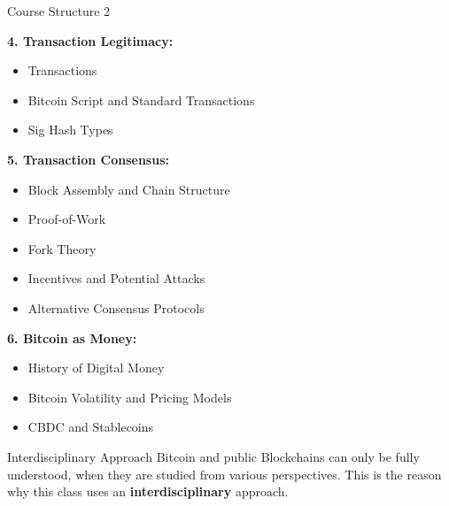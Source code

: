 \documentclass[handout]{beamer}
\begin{document}
\begin{frame}{Course Structure 2}
\footnotesize

\textbf{4. Transaction Legitimacy:}
	\begin{itemize}
		\item Transactions
		\item Bitcoin Script and Standard Transactions
		\item Sig Hash Types
	\end{itemize}	
	
\vspace{0.5em}

\textbf{5. Transaction Consensus:}
	\begin{itemize}
		\item Block Assembly and Chain Structure
		\item Proof-of-Work
		\item Fork Theory
		\item Incentives and Potential Attacks
		\item Alternative Consensus Protocols
	\end{itemize}

\vspace{0.5em}

\textbf{6. Bitcoin as Money:}
	\begin{itemize}
		\item History of Digital Money
		\item Bitcoin Volatility and Pricing Models
		\item CBDC and Stablecoins
	\end{itemize}
	
\end{frame}

\begin{frame}{Interdisciplinary Approach}
	\uncover<1->{
		\begin{figure}[h]
  			\center
			
		\end{figure}
	}
	\vspace{1em}
Bitcoin and public Blockchains can only be fully understood, when they are studied from various perspectives. This is the reason why this class uses an \color{focus} \textbf{interdisciplinary} \color{black} approach.	
\end{frame}
\end{document}
